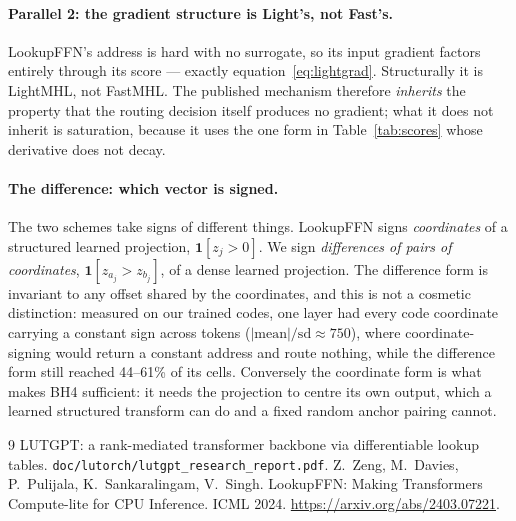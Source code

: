 \documentclass[11pt]{article}
\begin{document}
\paragraph{Parallel 2: the gradient structure is Light's, not Fast's.}
LookupFFN's address is hard with no surrogate, so its input gradient factors entirely
through its score --- exactly equation~\eqref{eq:lightgrad}. Structurally it is LightMHL,
not FastMHL. The published mechanism therefore \emph{inherits} the property that the
routing decision itself produces no gradient; what it does not inherit is saturation,
because it uses the one form in Table~\ref{tab:scores} whose derivative does not decay.

\paragraph{The difference: which vector is signed.}
The two schemes take signs of different things. LookupFFN signs \emph{coordinates} of a
structured learned projection, $\mathbf{1}[z_j>0]$. We sign \emph{differences of pairs of
coordinates}, $\mathbf{1}[z_{a_j}>z_{b_j}]$, of a dense learned projection. The
difference form is invariant to any offset shared by the coordinates, and this is not a
cosmetic distinction: measured on our trained codes, one layer had every code coordinate
carrying a constant sign across tokens ($|\mathrm{mean}|/\mathrm{sd}\approx 750$), where
coordinate-signing would return a constant address and route nothing, while the
difference form still reached 44--61\% of its cells. Conversely the coordinate form is
what makes BH4 sufficient: it needs the projection to centre its own output, which a
learned structured transform can do and a fixed random anchor pairing cannot.

\begin{thebibliography}{9}
 LUTGPT: a rank-mediated transformer backbone via differentiable lookup
tables. \texttt{doc/lutorch/lutgpt\_research\_report.pdf}.
 Z.~Zeng, M.~Davies, P.~Pulijala, K.~Sankaralingam, V.~Singh.
LookupFFN: Making Transformers Compute-lite for CPU Inference. ICML 2024.
\url{https://arxiv.org/abs/2403.07221}.
\end{thebibliography}
\end{document}
